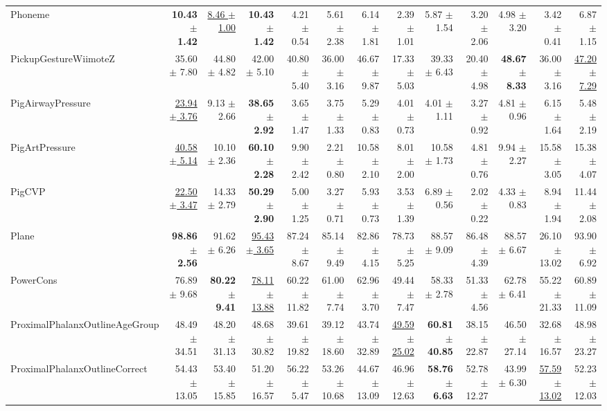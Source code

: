 \begin{landscape}
\begin{longtable}{lrrrrrrrrrrrr}
Phoneme & \textbf{10.43 $\pm$ 1.42} & \underline{8.46 $\pm$ 1.00} & \textbf{10.43 $\pm$ 1.42} & 4.21 $\pm$ 0.54 & 5.61 $\pm$ 2.38 & 6.14 $\pm$ 1.81 & 2.39 $\pm$ 1.01 & 5.87 $\pm$ 1.54 & 3.20 $\pm$ 2.06 & 4.98 $\pm$ 3.20 & 3.42 $\pm$ 0.41 & 6.87 $\pm$ 1.15 \\
PickupGestureWiimoteZ & 35.60 $\pm$ 7.80 & 44.80 $\pm$ 4.82 & 42.00 $\pm$ 5.10 & 40.80 $\pm$ 5.40 & 36.00 $\pm$ 3.16 & 46.67 $\pm$ 9.87 & 17.33 $\pm$ 5.03 & 39.33 $\pm$ 6.43 & 20.40 $\pm$ 4.98 & \textbf{48.67 $\pm$ 8.33} & 36.00 $\pm$ 3.16 & \underline{47.20 $\pm$ 7.29} \\
PigAirwayPressure & \underline{23.94 $\pm$ 3.76} & 9.13 $\pm$ 2.66 & \textbf{38.65 $\pm$ 2.92} & 3.65 $\pm$ 1.47 & 3.75 $\pm$ 1.33 & 5.29 $\pm$ 0.83 & 4.01 $\pm$ 0.73 & 4.01 $\pm$ 1.11 & 3.27 $\pm$ 0.92 & 4.81 $\pm$ 0.96 & 6.15 $\pm$ 1.64 & 5.48 $\pm$ 2.19 \\
PigArtPressure & \underline{40.58 $\pm$ 5.14} & 10.10 $\pm$ 2.36 & \textbf{60.10 $\pm$ 2.28} & 9.90 $\pm$ 2.42 & 2.21 $\pm$ 0.80 & 10.58 $\pm$ 2.10 & 8.01 $\pm$ 2.00 & 10.58 $\pm$ 1.73 & 4.81 $\pm$ 0.76 & 9.94 $\pm$ 2.27 & 15.58 $\pm$ 3.05 & 15.38 $\pm$ 4.07 \\
PigCVP & \underline{22.50 $\pm$ 3.47} & 14.33 $\pm$ 2.79 & \textbf{50.29 $\pm$ 2.90} & 5.00 $\pm$ 1.25 & 3.27 $\pm$ 0.71 & 5.93 $\pm$ 0.73 & 3.53 $\pm$ 1.39 & 6.89 $\pm$ 0.56 & 2.02 $\pm$ 0.22 & 4.33 $\pm$ 0.83 & 8.94 $\pm$ 1.94 & 11.44 $\pm$ 2.08 \\
Plane & \textbf{98.86 $\pm$ 2.56} & 91.62 $\pm$ 6.26 & \underline{95.43 $\pm$ 3.65} & 87.24 $\pm$ 8.67 & 85.14 $\pm$ 9.49 & 82.86 $\pm$ 4.15 & 78.73 $\pm$ 5.25 & 88.57 $\pm$ 9.09 & 86.48 $\pm$ 4.39 & 88.57 $\pm$ 6.67 & 26.10 $\pm$ 13.02 & 93.90 $\pm$ 6.92 \\
PowerCons & 76.89 $\pm$ 9.68 & \textbf{80.22 $\pm$ 9.41} & \underline{78.11 $\pm$ 13.88} & 60.22 $\pm$ 11.82 & 61.00 $\pm$ 7.74 & 62.96 $\pm$ 3.70 & 49.44 $\pm$ 7.47 & 58.33 $\pm$ 2.78 & 51.33 $\pm$ 4.56 & 62.78 $\pm$ 6.41 & 55.22 $\pm$ 21.33 & 60.89 $\pm$ 11.09 \\
ProximalPhalanxOutlineAgeGroup & 48.49 $\pm$ 34.51 & 48.20 $\pm$ 31.13 & 48.68 $\pm$ 30.82 & 39.61 $\pm$ 19.82 & 39.12 $\pm$ 18.60 & 43.74 $\pm$ 32.89 & \underline{49.59 $\pm$ 25.02} & \textbf{60.81 $\pm$ 40.85} & 38.15 $\pm$ 22.87 & 46.50 $\pm$ 27.14 & 32.68 $\pm$ 16.57 & 48.98 $\pm$ 23.27 \\
ProximalPhalanxOutlineCorrect & 54.43 $\pm$ 13.05 & 53.40 $\pm$ 15.85 & 51.20 $\pm$ 16.57 & 56.22 $\pm$ 5.47 & 53.26 $\pm$ 10.68 & 44.67 $\pm$ 13.09 & 46.96 $\pm$ 12.63 & \textbf{58.76 $\pm$ 6.63} & 52.78 $\pm$ 12.27 & 43.99 $\pm$ 6.30 & \underline{57.59 $\pm$ 13.02} & 52.23 $\pm$ 12.03 \\

\end{longtable}
\end{landscape}
